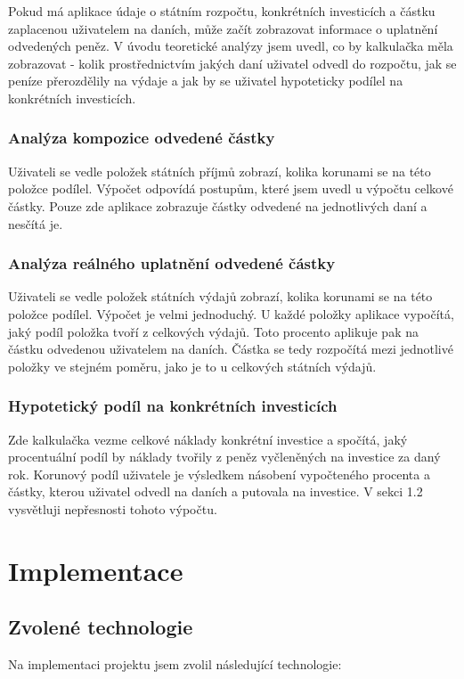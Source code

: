 \documentclass[11pt,a4paper,twoside,openright]{report}
\begin{document}
Pokud má aplikace údaje o státním rozpočtu, konkrétních investicích a částku zaplacenou
uživatelem na daních, může začít zobrazovat informace o uplatnění odvedených peněz. V úvodu
teoretické analýzy jsem uvedl, co by kalkulačka měla zobrazovat - kolik prostřednictvím
jakých daní uživatel odvedl do rozpočtu, jak se peníze přerozdělily na výdaje a jak
by se uživatel hypoteticky podílel na konkrétních investicích.

\subsection{Analýza kompozice odvedené částky}

Uživateli se vedle položek státních příjmů zobrazí, kolika korunami se na této položce podílel.
Výpočet odpovídá postupům, které jsem uvedl u výpočtu celkové částky. Pouze zde aplikace
zobrazuje částky odvedené na jednotlivých daní a nesčítá je.

\subsection{Analýza reálného uplatnění odvedené částky}

Uživateli se vedle položek státních výdajů zobrazí, kolika korunami se na této položce podílel.
Výpočet je velmi jednoduchý. U každé položky aplikace vypočítá, jaký podíl položka tvoří
z celkových výdajů. Toto procento aplikuje pak na částku odvedenou uživatelem na daních.
Částka se tedy rozpočítá mezi jednotlivé položky ve stejném poměru, jako je to u
celkových státních výdajů.

\subsection{Hypotetický podíl na konkrétních investicích}

Zde kalkulačka vezme celkové náklady konkrétní investice a spočítá, jaký procentuální podíl
by náklady tvořily z peněz vyčleněných na investice za daný rok. Korunový podíl uživatele
je výsledkem násobení vypočteného procenta a částky, kterou uživatel odvedl na daních a
putovala na investice. V sekci 1.2 vysvětluji nepřesnosti tohoto výpočtu.

\chapter{Implementace}

\section{Zvolené technologie}
Na implementaci projektu jsem zvolil následující technologie:
\end{document}
